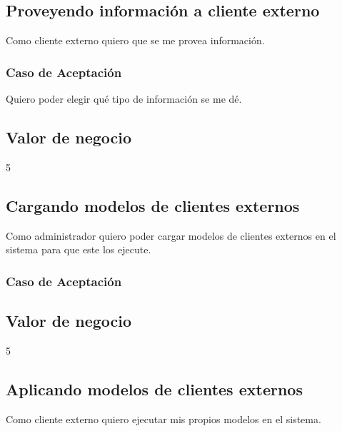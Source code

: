 \linea \subsection*{Proveyendo información a cliente externo}
Como cliente externo quiero que se me provea información.
\subsubsection*{Caso de Aceptación}
Quiero poder elegir qué tipo de información se me dé.
\subsection*{Valor de negocio}
5


\linea \subsection*{Cargando modelos de clientes externos}
Como administrador quiero poder cargar modelos de clientes externos en el sistema para que este los ejecute.
\subsubsection*{Caso de Aceptación}
\subsection*{Valor de negocio}
5


\linea \subsection*{Aplicando modelos de clientes externos}
Como cliente externo quiero ejecutar mis propios modelos en el sistema.
